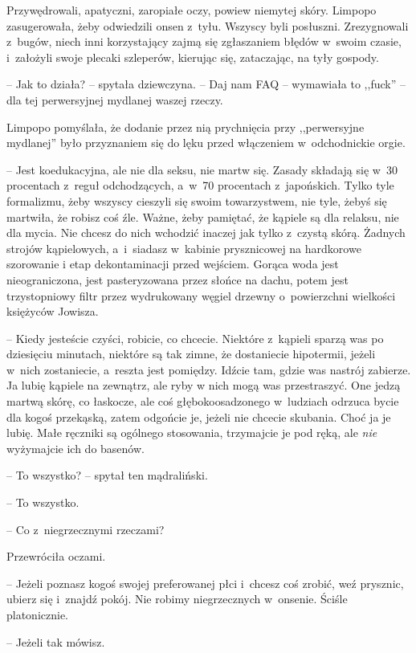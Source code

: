 \documentclass[oneside,polish,11pt,sfheadings]{mwbk}
\begin{document}
Przywędrowali, apatyczni, zaropiałe oczy, powiew niemytej skóry. Limpopo
zasugerowała, żeby odwiedzili onsen z~tyłu. Wszyscy byli posłuszni.
Zrezygnowali z~bugów, niech inni korzystający zajmą się zgłaszaniem
błędów w~swoim czasie, i~założyli swoje plecaki szleperów, kierując się,
zataczając, na tyły gospody.

-- Jak to działa? -- spytała dziewczyna. -- Daj nam FAQ -- wymawiała to
,,fuck'' -- dla tej perwersyjnej mydlanej waszej rzeczy. 

Limpopo pomyślała, że dodanie przez nią prychnięcia przy ,,perwersyjne
mydlanej'' było przyznaniem się do lęku przed włączeniem w~odchodnickie
orgie.

-- Jest koedukacyjna, ale nie dla seksu, nie martw się. Zasady składają
się w~30 procentach z~reguł odchodzących, a~w~70 procentach z~japońskich. Tylko tyle formalizmu, żeby wszyscy cieszyli się swoim
towarzystwem, nie tyle, żebyś się martwiła, że robisz coś źle. Ważne,
żeby pamiętać, że kąpiele są dla relaksu, nie dla mycia. Nie chcesz do
nich wchodzić inaczej jak tylko z~czystą skórą. Żadnych strojów
kąpielowych, a~i~siadasz w~kabinie prysznicowej na hardkorowe szorowanie
i etap dekontaminacji przed wejściem. Gorąca woda jest nieograniczona,
jest pasteryzowana przez słońce na dachu, potem jest trzystopniowy filtr
przez wydrukowany węgiel drzewny o~powierzchni wielkości księżyców
Jowisza.

-- Kiedy jesteście czyści, robicie, co chcecie. Niektóre z~kąpieli sparzą
was po dziesięciu minutach, niektóre są tak zimne, że dostaniecie
hipotermii, jeżeli w~nich zostaniecie, a~reszta jest pomiędzy. Idźcie
tam, gdzie was nastrój zabierze. Ja lubię kąpiele na zewnątrz, ale ryby
w nich mogą was przestraszyć. One jedzą martwą skórę, co łaskocze, ale
coś głęboko\dywiz osadzonego w~ludziach odrzuca bycie dla kogoś przekąską,
zatem odgońcie je, jeżeli nie chcecie skubania. Choć ja je lubię. Małe
ręczniki są ogólnego stosowania, trzymajcie je pod ręką, ale \textit{nie}
wyżymajcie ich do basenów.

-- To wszystko? -- spytał ten mądraliński.

-- To wszystko.

-- Co z~niegrzecznymi rzeczami?

Przewróciła oczami. 

-- Jeżeli poznasz kogoś swojej preferowanej płci i~chcesz coś zrobić, weź prysznic, ubierz się i~znajdź pokój. Nie robimy
niegrzecznych w~onsenie. Ściśle platonicznie.

-- Jeżeli tak mówisz.
\end{document}
